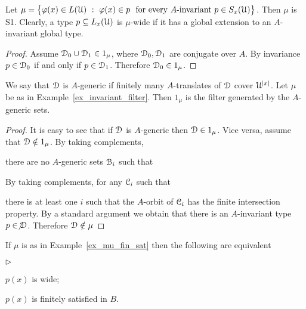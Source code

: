 \documentclass{amsproc}
\newcommand{\mylabel}[1]{{#1}\hfill}
\renewenvironment{itemize}
  {\begin{list}{$\triangleright$}{%
  \setlength{\parskip}{0mm}
  \setlength{\topsep}{.4\baselineskip}
  \setlength{\rightmargin}{0mm}
  \setlength{\listparindent}{0mm}
  \setlength{\itemindent}{0mm}
  \setlength{\labelwidth}{3ex}
  \setlength{\itemsep}{.2\baselineskip}
  \setlength{\parsep}{.2\baselineskip}
  \setlength{\partopsep}{0mm}
  \setlength{\labelsep}{1ex}
  \setlength{\leftmargin}{\labelwidth+\labelsep}
  \let\makelabel\mylabel}}{%
\end{list}}
\begin{document}
\begin{example}\label{ex_invariant_filter}
  Let $\mu=\big\{\varphi(x)\in L(\EuScript U)\ :\ \varphi(x)\in p\ {\rm\ for\ every\ } A\textrm{-invariant}\ p\in S_x(\EuScript U) \big\}$.
  Then $\mu$ is S1.
  Clearly, a type $p\subseteq L_x(\EuScript U)$ is $\mu$-wide if it has a global extension to an $A$-invariant global type.
\end{example}

\begin{proof}
  Assume $\EuScript D_0\cup\EuScript D_1\in1_\mu$, where $\EuScript D_0,\EuScript D_1$ are conjugate over $A$.
  By invariance $p\in\EuScript D_0$ if and only if $p\in\EuScript D_1$. Therefore $\EuScript D_0\in1_\mu$.
\end{proof}

\begin{example}
  We say that $\EuScript D$ is $A$-generic if finitely many $A$-translates of $\EuScript D$ cover $\EuScript U^{|x|}$.
  Let $\mu$ be as in Example~\ref{ex_invariant_filter}.
  Then $1_\mu$ is the filter generated by the $A$-generic sets.
\end{example}
  
\begin{proof}
  It is easy to see that if $\EuScript D$ is $A$-generic then $\EuScript D\in1_\mu$.
  Vice versa, assume that $\EuScript D\notin1_\mu$.
  By taking complements, 
  
  there are no $A$-generic sets $\EuScript B_i$ such that 


  By taking complements, for any $\EuScript C_i$ such that 
  

  there is at least one $i$ such that the $A$-orbit of $\EuScript C_i$ has the finite intersection property.
  By a standard argument we obtain that there is an $A$-invariant type $p\in\not\EuScript D$.
  Therefore $\EuScript D\notin\mu$
\end{proof}

\begin{example}
  If $\mu$ is as in Example~\ref{ex_mu_fin_sat} then the following are equivalent
  \begin{itemize}
    \item[1.] $p(x)$ is wide;
    \item[2.] $p(x)$ is finitely satisfied in $B$.
  \end{itemize}
\end{example}
\end{document}
